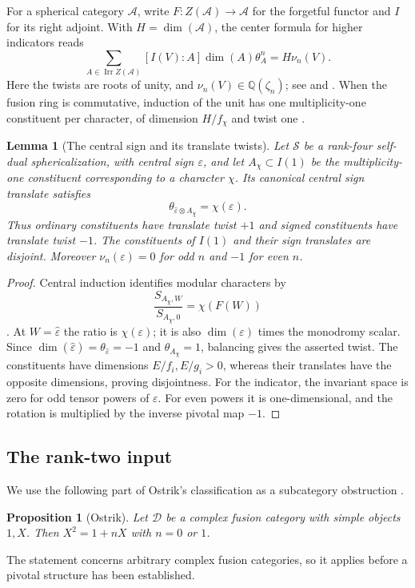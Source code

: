 \documentclass[11pt,a4paper]{article}
\newtheorem{proposition}[theorem]{Proposition}
\newtheorem{lemma}[theorem]{Lemma}
\theoremstyle{definition}\newtheorem{definition}[theorem]{Definition}
\theoremstyle{remark}\newtheorem{remark}[theorem]{Remark}
\DeclareMathOperator{\Irr}{Irr}
\newcommand{\Q}{\mathbb Q}
\numberwithin{equation}{section}
\begin{document}
For a spherical category $\mathcal A$, write
$F:Z(\mathcal A)\to\mathcal A$ for the forgetful functor and $I$
for its right adjoint. With $H=\dim(\mathcal A)$, the center formula
for higher indicators reads
\begin{equation}\label{core:central-indicator}
\sum_{A\in\Irr Z(\mathcal A)}[I(V):A]\dim(A)\theta_A^n=H\nu_n(V).
\end{equation}
Here the twists are roots of unity, and
$\nu_n(V)\in\Q(\zeta_n)$; see \cite[Theorem~4.1]{NS} and
\cite[Theorem~5.1]{NSHigher}. When the fusion ring is commutative, induction of the unit has one
multiplicity-one constituent per character, of dimension $H/f_\chi$
and twist one \cite[Theorems~2.5 and~2.13]{Ostrik3}.
\begin{lemma}[The central sign and its translate twists]
\label{core:lem:translate-twists}
Let $\mathcal S$ be a rank-four self-dual sphericalization, with
central sign $\varepsilon$, and let $A_\chi\subset I(1)$ be the
multiplicity-one constituent corresponding to a character $\chi$.
Its canonical central sign translate satisfies
\[
 \theta_{\widehat\varepsilon\otimes A_\chi}=\chi(\varepsilon).
\]
Thus ordinary constituents have translate twist $+1$ and signed
constituents have translate twist $-1$. The constituents of $I(1)$
and their sign translates are disjoint. Moreover
$\nu_n(\varepsilon)=0$ for odd $n$ and $-1$ for even $n$.
\end{lemma}
\begin{proof}
Central induction identifies modular characters by
\[
 \frac{S_{A_\chi,W}}{S_{A_\chi,0}}=\chi(F(W))
\]
\cite[Example~2.9 and the paragraph preceding Theorem~2.13]{Ostrik3}.
At $W=\widehat\varepsilon$ the ratio is $\chi(\varepsilon)$;
it is also $\dim(\varepsilon)$ times the monodromy scalar.
Since $\dim(\widehat\varepsilon)=\theta_{\widehat\varepsilon}=-1$
and $\theta_{A_\chi}=1$, balancing gives the asserted twist.
The constituents have dimensions $E/f_i,E/g_i>0$, whereas their
translates have the opposite dimensions, proving disjointness.
For the indicator, the invariant space is zero for odd tensor powers
of $\varepsilon$. For even powers it is one-dimensional, and the
rotation is multiplied by the inverse pivotal map $-1$.
\end{proof}

\subsection{The rank-two input}

We use the following part of Ostrik's classification as a subcategory
obstruction \cite[Main Theorem, p.~178]{OstrikRankTwo}.
\begin{proposition}[Ostrik]\label{core:prop:rank-two}
Let $\mathcal D$ be a complex fusion category with simple objects
$1,X$. Then $X^2=1+nX$ with $n=0$ or $1$.
\end{proposition}
The statement concerns arbitrary complex fusion categories, so it applies
before a pivotal structure has been established.
\end{document}
